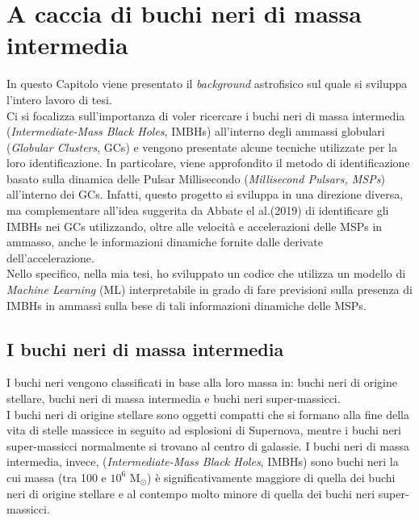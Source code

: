 \chapter{A caccia di buchi neri di massa intermedia}
\label{chap:cap1}

In questo Capitolo viene presentato il \textit{background} astrofisico sul quale si sviluppa l'intero lavoro di tesi.\\
Ci si focalizza sull'importanza di voler ricercare i buchi neri di massa intermedia (\textit{Intermediate-Mass Black Holes}, IMBHs) all'interno degli ammassi globulari (\textit{Globular Clusters}, GCs) e vengono presentate alcune tecniche utilizzate per la loro identificazione. In particolare, viene approfondito il metodo di identificazione basato sulla dinamica delle Pulsar Millisecondo (\textit{Millisecond Pulsars, MSPs}) all'interno dei GCs. Infatti, questo progetto si sviluppa in una direzione diversa, ma complementare all'idea suggerita da Abbate el al.(2019) \cite{abbate1:paper} di identificare gli IMBHs nei GCs utilizzando, oltre alle velocità e accelerazioni delle MSPs in ammasso, anche le informazioni dinamiche fornite dalle derivate dell'accelerazione.\\
Nello specifico, nella mia tesi, ho sviluppato un codice che utilizza un modello di \textit{Machine Learning} (ML) interpretabile in grado di fare previsioni sulla presenza di IMBHs in ammassi sulla bese di tali informazioni dinamiche delle MSPs.

\section{I buchi neri di massa intermedia}
\label{sec:IMBH}
I buchi neri vengono classificati in base alla loro massa in: buchi neri di origine stellare, buchi neri di massa intermedia e buchi neri super-massicci.\\
I buchi neri di origine stellare sono oggetti compatti che si formano alla fine della vita di stelle massicce in seguito ad esplosioni di Supernova, mentre i buchi neri super-massicci normalmente si trovano al centro di galassie. I buchi neri di massa intermedia, invece, (\textit{Intermediate-Mass Black Holes}, IMBHs) sono buchi neri la cui massa (tra 100 e $10^{6}$ M$_{\odot}$) è significativamente maggiore di quella dei buchi neri di origine stellare e al contempo molto minore di quella dei buchi neri super-massicci.

